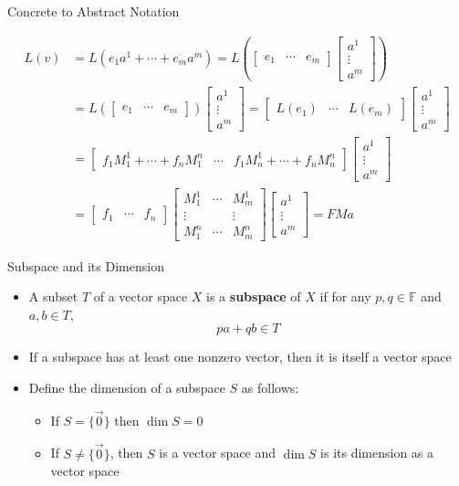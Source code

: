 \documentclass[usenames,dvipsnames,10pt]{beamer}
\newcommand\bbm{\begin{bmatrix}}\newcommand\ebm{\end{bmatrix}}
\newcommand\F{\mathbb{F}}
\newcommand\zero{\vec{0}}
\begin{document}
\begin{frame}
  {Concrete to Abstract Notation}

  \begin{align*}
    L(v) &= L(e_1a^1 + \cdots + e_ma^m)
           = L\left(\begin{bmatrix} e_1 & \cdots & e_m \end{bmatrix}\bbm a^1 \\ \vdots \\ a^m\ebm\right)\\
         & = L\left(\begin{bmatrix} e_1 & \cdots & e_m \end{bmatrix}\right)\bbm a^1 \\ \vdots \\ a^m\ebm
    = \bbm L(e_1) & \cdots & L(e_m) \ebm\bbm a^1 \\ \vdots \\ a^m\ebm\\
         &= \bbm f_1M^1_1+ \cdots+f_nM^n_1 & \cdots & f_1M^1_n+\cdots+f_nM^n_n \ebm\bbm a^1 \\ \vdots \\ a^m\ebm\\
         &= \bbm f_1 & \cdots & f_n\ebm\bbm M^1_1 & \cdots & M^1_m \\ \vdots & & \vdots \\ M^n_1 & \cdots & M^n_m \ebm \bbm a^1 \\ \vdots \\ a^m\ebm
    = FMa
  \end{align*}
\end{frame}

\begin{frame}
  {Subspace and its Dimension}

  \begin{itemize}
  \item A subset $T$ of a vector space $X$ is a {\bf subspace} of $X$ if for any $p, q \in \F$ and $a, b \in T$,
    \[
      pa + qb \in T
    \]
  \item If a subspace has at least one nonzero vector, then it is itself a vector space
  \item Define the dimension of a subspace $S$ as follows:
    \begin{itemize}
    \item If $S = \{\zero\}$ then $\dim S = 0$
    \item If $S \ne \{\zero\}$, then $S$ is a vector space and $\dim S$ is its dimension as a vector space
    \end{itemize}
  \end{itemize}
\end{frame}
\end{document}
